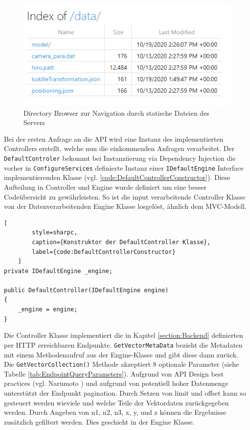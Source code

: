 \begin{figure}
	\centering
	\includegraphics[width=0.7\linewidth]{images/backend/DirectoryBrowser}
	\caption{Directory Browser zur Navigation durch statische Dateien des Servers}
	\label{fig:DirectoryBrowser}
\end{figure}

Bei der ersten Anfrage an die API wird eine Instanz des implementierten
Controllers erstellt, welche nun die einkommenden Anfragen verarbeitet.
Der \texttt{DefaultControler} bekommt bei Instanziierung via Dependency Injection
die vorher in \texttt{ConfigureServices} definierte Instanz einer \texttt{IDefaultEngine}
Interface implementierenden Klasse
(vgl. \lstlistingname\space \ref{code:DefaultControllerConstructor}).
Diese Aufteilung in Controller und Engine wurde definiert um eine besser
Codeübersicht zu gewährleisten. So ist die input verarbeitende Controller
Klasse von der Datenverarbeitenden Engine Klasse losgelöst, ähnlich dem MVC-Modell.

\begin{codeblock}
	\begin{lstlisting}[
		style=sharpc,
		caption={Konstruktor der DefaultController Klasse},
		label={code:DefaultControllerConstructor}
	]
private IDefaultEngine _engine;

public DefaultController(IDefaultEngine engine)
{
	_engine = engine;
}
	\end{lstlisting}
\end{codeblock}

Die Controller Klasse implementiert die in Kapitel \ref{section:Backend}
definierten per HTTP erreichbaren Endpunkte. \texttt{GetVectorMetaData} bezieht die Metadaten mit einem
Methodenaufruf aus der Engine-Klasse und gibt diese dann zurück.
Die \texttt{GetVectorCollection()} Methode akzeptiert 8 optionale Parameter
(siehe Tabelle \ref{tab:EndpointQueryParameters}). Aufgrund von API
Design best practices (vgl. Narumoto \cite{ApiDesignBestPractices})
und aufgrund von potentiell hoher Datenmenge unterstützt der Endpunkt
pagination. Durch Setzen von limit und offset kann so gesteuert werden
wieviele und welche Teile der Vektordaten zurückgegeben werden.
Durch Angeben von n1, n2, n3, x, y, und z können die Ergebnisse
zusätzlich gefiltert werden. Dies geschieht in der Engine Klasse.

